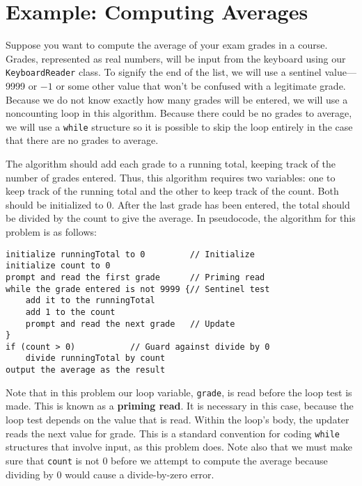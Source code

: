 \section{Example: Computing Averages}
\noindent Suppose you want to compute the average of your exam grades in a
  course.  Grades,
represented as real numbers, will be input from the keyboard using our
{\tt KeyboardReader} class. To signify the end of the list, we will
use a sentinel value---9999 or $-1$ or some other value that won't be
confused with a legitimate grade. Because we do not know exactly how
many grades will be entered, we will use a noncounting loop in this
algorithm. Because there could be no grades to average, we will use a
{\tt while} structure so it is possible to skip the loop entirely in
the case that there are no grades to average.

The algorithm should add each grade to a running total, keeping track
of the number of grades entered. Thus, this algorithm requires two
variables: one to keep track of the running total and the other to
keep track of the count. Both should be initialized to 0.  After the
last grade has been entered, the total should be divided by the count
to give the average.  In pseudocode, the algorithm for this problem is
as follows:

\begin{jjjlisting}
\begin{lstlisting}
initialize runningTotal to 0         // Initialize
initialize count to 0
prompt and read the first grade      // Priming read
while the grade entered is not 9999 {// Sentinel test
    add it to the runningTotal
    add 1 to the count
    prompt and read the next grade   // Update
}
if (count > 0)           // Guard against divide by 0
    divide runningTotal by count
output the average as the result
\end{lstlisting}
\end{jjjlisting}

\noindent Note that in this problem our loop variable, {\tt grade},
 is read before the loop test is made. This
is known as a {\bf priming read}. It is necessary in this case,
because the loop test depends on the value that is read.  Within the
loop's body, the updater reads the next value for grade. This is a
standard convention for coding {\tt while} structures that involve
input, as this problem does. Note also that we must make sure that
{\tt count} is not 0 before we attempt to compute the
average because dividing by 0 would cause a divide-by-zero error.

